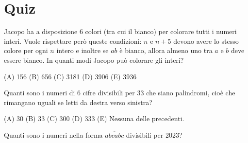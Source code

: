 \chapter{Quiz}
\label{ch:quiz}

\begin{esercizio}
    \label{ex:distrettuali_2019}
    Jacopo ha a disposizione 6 colori (tra cui il bianco) per colorare tutti i numeri interi.
    Vuole rispettare però queste condizioni: $n$ e $n + 5$ devono avere lo stesso colore per ogni $n$ intero e
    inoltre se $ab$ è bianco, allora almeno uno tra $a$ e $b$ deve essere bianco.
    In quanti modi Jacopo può colorare gli interi?

    (A) 156 \quad (B) 656 \quad (C) 3181 \quad (D) 3906 \quad (E) 3936
\end{esercizio}

\begin{esercizio}
    \label{ex:distrettuali_2021}
    Quanti sono i numeri di 6 cifre divisibili per 33 che siano palindromi, cioè che rimangano uguali
    se letti da destra verso sinistra?

    (A) 30 \quad (B) 33 \quad (C) 300 \quad (D) 333 \quad (E) Nessuna delle precedenti.
\end{esercizio}

\begin{esercizio}
    \label{ex:francesco_1}
    Quanti sono i numeri nella forma $\overline{abcabc}$ divisibili per 2023?
\end{esercizio}
